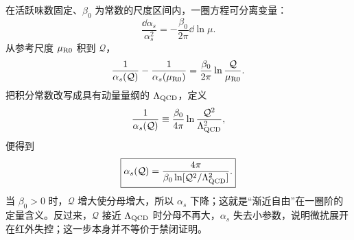 \begin{derivation}
在活跃味数固定、\(\beta_0\) 为常数的尺度区间内，一圈方程可分离变量：
\begin{equation*}
\frac{\dd\alpha_s}{\alpha_s^2}
=-\frac{\beta_0}{2\pi}\dd\ln\mu.
\end{equation*}
从参考尺度 \(\mu_{\rm R0}\) 积到 \(\mathcal Q\)，
\begin{equation*}
\frac1{\alpha_s(\mathcal Q)}
-\frac1{\alpha_s(\mu_{\rm R0})}
=\frac{\beta_0}{2\pi}
\ln\frac{\mathcal Q}{\mu_{\rm R0}}.
\end{equation*}
把积分常数改写成具有动量量纲的 \(\Lambda_{\rm QCD}\)，定义
\begin{equation*}
\frac1{\alpha_s(\mathcal Q)}
\equiv
\frac{\beta_0}{4\pi}
\ln\frac{\mathcal Q^2}{\Lambda_{\rm QCD}^2},
\end{equation*}
便得到
\begin{equation*}
\boxed{
\alpha_s(\mathcal Q)
=\frac{4\pi}{\beta_0
\ln[\mathcal Q^2/\Lambda_{\rm QCD}^2]}.}
\end{equation*}
当 \(\beta_0>0\) 时，\(\mathcal Q\) 增大使分母增大，所以 \(\alpha_s\) 下降；这就是“渐近自由”在一圈阶的定量含义。反过来，\(\mathcal Q\) 接近 \(\Lambda_{\rm QCD}\) 时分母不再大，\(\alpha_s\) 失去小参数，说明微扰展开在红外失控；这一步本身并不等价于禁闭证明。
\end{derivation}
